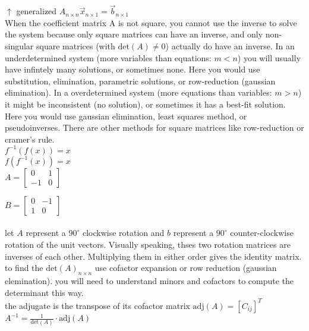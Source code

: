 \documentclass{article}
\begin{document}
$\uparrow$ generalized $A_{n \times n}\vec{x}_{n \times 1} = \vec{b}_{n \times 1}$\\

When the coefficient matrix A is not square, you cannot use the inverse to solve the system because only square matrices can have an inverse, and only non-singular square matrices (with $\text{det}(A) \neq 0$) actually do have an inverse. In an underdetermined system (more variables than equations: $m < n$) you will usually have infintely many solutions, or sometimes none. Here you would use substitution, elimination, parametric solutions, or row-reduction (gaussian elimination). In a overdetermined system (more equations than variables: $m > n$) it might be inconsistent (no solution), or sometimes it has a best-fit solution. Here you would use gaussian elimination, least squares method, or pseudoinverses. There are other methods for square matrices like row-reduction or cramer's rule.\\

$f^{-1}(f(x)) = x$\\
$f(f^{-1}(x)) = x$\\

$A =
\begin{bmatrix}
0 & 1\\
-1 & 0
\end{bmatrix}
$

$B =
\begin{bmatrix}
0 & -1\\
1 & 0
\end{bmatrix}
$\\\\

let $A$ represent a $90^{\circ}$ clockwise rotation and $b$ represent a $90^{\circ}$ counter-clockwise rotation of the unit vectors. Visually speaking, thses two rotation matrices are inverses of each other. Multiplying them in either order gives the identity matrix.\\

to find the $\text{det}(A)_{n \times n}$ use cofactor expansion or row reduction (gaussian elemination). you will need to understand minors and cofactors to compute the determinant this way.\\

the adjugate is the transpose of its cofactor matrix $\text{adj}(A) = [C_{ij}]^T$\\

$A^{-1} = \frac{1}{\text{det}(A)} \cdot \text{adj}(A)$\\
\end{document}
